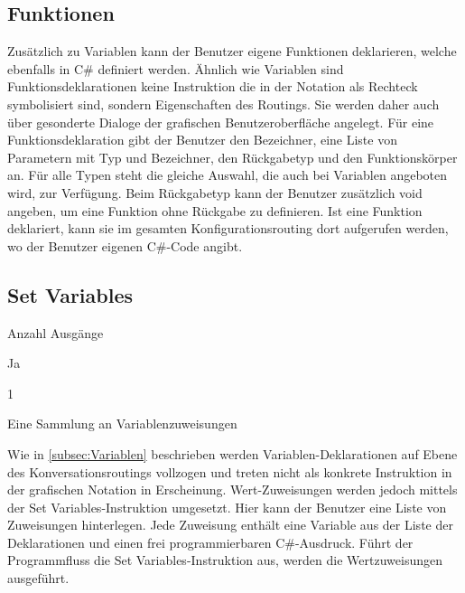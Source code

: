 \subsection{Funktionen}
Zusätzlich zu Variablen kann der Benutzer eigene Funktionen deklarieren, welche ebenfalls in C\# definiert werden. Ähnlich wie Variablen sind Funktionsdeklarationen keine Instruktion die in der Notation als Rechteck symbolisiert sind, sondern Eigenschaften des Routings. Sie werden daher auch über gesonderte Dialoge der grafischen Benutzeroberfläche angelegt. Für eine Funktionsdeklaration gibt der Benutzer den Bezeichner, eine Liste von Parametern mit Typ und Bezeichner, den Rückgabetyp und den Funktionskörper an. Für alle Typen steht die gleiche Auswahl, die auch bei Variablen angeboten wird, zur Verfügung. Beim Rückgabetyp kann der Benutzer zusätzlich void angeben, um eine Funktion ohne Rückgabe zu definieren. Ist eine Funktion deklariert, kann sie im gesamten Konfigurationsrouting dort aufgerufen werden, wo der Benutzer eigenen C\#-Code angibt.  

\subsection{Set Variables}
\label{subsec:Set Variables}
\begin{labeling}{Anzahl Ausgänge}
\item [Eingang] Ja
\item [Anzahl Ausgänge] 1
\item [Parameter] Eine Sammlung an Variablenzuweisungen
\item [Beschreibung] Wie in \ref{subsec:Variablen} beschrieben werden Variablen-Deklarationen auf Ebene des Konversationsroutings vollzogen und treten nicht als konkrete Instruktion in der grafischen Notation in Erscheinung. Wert-Zuweisungen werden jedoch mittels der Set Variables-Instruktion umgesetzt. Hier kann der Benutzer eine Liste von Zuweisungen hinterlegen. Jede Zuweisung enthält eine Variable aus der Liste der Deklarationen und einen frei programmierbaren C\#-Ausdruck. Führt der Programmfluss die Set Variables-Instruktion aus, werden die Wertzuweisungen ausgeführt.
\end{labeling}

